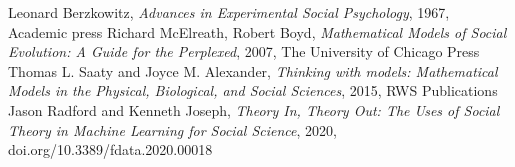 \documentclass[a4paper,12pt]{article}
\begin{document}
\begin{thebibliography}{9}

 Leonard Berzkowitz,%
	\emph{ Advances in Experimental Social Psychology}, 1967,  Academic press
 Richard McElreath, Robert Boyd,%
	\emph{ Mathematical Models of Social Evolution: A Guide for the Perplexed}, 2007, The University of Chicago Press
Thomas L. Saaty and Joyce M. Alexander,%
	\emph{Thinking with models: Mathematical Models in the Physical, Biological, and Social Sciences}, 2015, RWS Publications
Jason Radford and Kenneth Joseph,%
	\emph{Theory In, Theory Out: The Uses of Social Theory in Machine Learning for Social Science}, 2020, doi.org/10.3389/fdata.2020.00018

\end{thebibliography}
\end{document}
